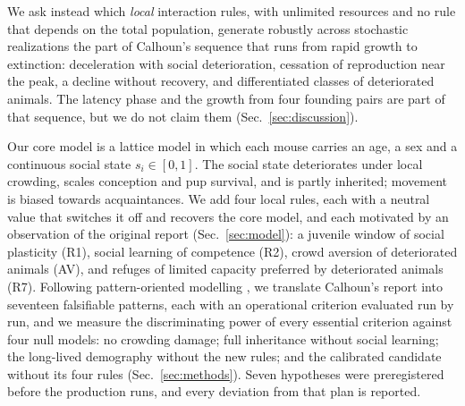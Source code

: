 We ask instead which \emph{local} interaction rules, with unlimited resources and no rule that depends on the total
population, generate robustly across stochastic realizations the part of Calhoun's sequence that runs from rapid
growth to extinction: deceleration with social deterioration, cessation of reproduction near the peak, a decline
without recovery, and differentiated classes of deteriorated animals. The latency phase and the growth from four
founding pairs are part of that sequence, but we do not claim them (Sec.~\ref{sec:discussion}).

Our core model is a lattice model in which each mouse carries an age, a sex and a continuous social state
$s_i\in[0,1]$. The social state deteriorates under local crowding, scales conception and pup survival, and is partly
inherited; movement is biased towards acquaintances. We add four local rules, each with a neutral value that
switches it off and recovers the core model, and each motivated by an observation of the original report (Sec.~\ref{sec:model}): a
juvenile window of social plasticity (R1), social learning of competence (R2), crowd aversion of deteriorated
animals (AV), and refuges of limited capacity preferred by deteriorated animals (R7). Following pattern-oriented
modelling \cite{Grimm2005}, we translate Calhoun's report into seventeen falsifiable patterns, each with an
operational criterion evaluated run by run, and we measure the discriminating power of every essential criterion
against four null models: no crowding damage; full inheritance without social learning; the long-lived demography
without the new rules; and the calibrated candidate without its four rules (Sec.~\ref{sec:methods}). Seven
hypotheses were preregistered before the production runs, and every deviation from that plan is reported.

